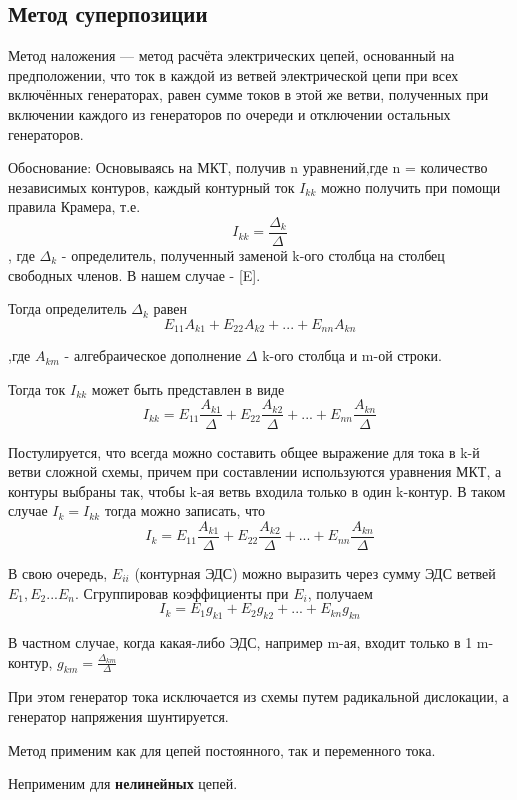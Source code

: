 \subsection{Метод суперпозиции}

Метод наложения — метод расчёта электрических цепей, основанный на предположении, что ток в каждой из ветвей электрической цепи при всех включённых генераторах, равен сумме токов в этой же ветви, полученных при включении каждого из генераторов по очереди и отключении остальных генераторов.

Обоснование:
Основываясь на МКТ, получив n уравнений,где n = количество независимых контуров, каждый контурный ток $I_{kk}$ можно получить при помощи правила Крамера, т.е.
$$ I_{kk} = \frac{\Delta_{k}}{\Delta} $$
, где $\Delta_{k}$ - определитель, полученный заменой k-ого столбца на столбец свободных членов. В нашем случае - [E].

Тогда определитель $\Delta_{k}$ равен 
$$ E_{11}A_{k1} + E_{22}A_{k2} + ... + E_{nn}A_{kn}  $$

,где $A_{km}$ - алгебраическое дополнение $\Delta$ k-ого столбца и m-ой строки.

Тогда ток $I_{kk}$ может быть представлен в виде
$$ I_{kk} =  E_{11}\frac{A_{k1}}{\Delta} + E_{22}\frac{A_{k2}}{\Delta} + ... + E_{nn}\frac{A_{kn}}{\Delta} $$

Постулируется, что всегда можно составить общее выражение для тока в k-й ветви сложной схемы, причем при составлении используются уравнения МКТ, а контуры выбраны так, чтобы k-ая ветвь входила только в один k-контур. В таком случае $I_{k} = I_{kk}$  тогда можно записать, что 
$$ I_{k} =  E_{11}\frac{A_{k1}}{\Delta} + E_{22}\frac{A_{k2}}{\Delta} + ... + E_{nn}\frac{A_{kn}}{\Delta} $$

В свою очередь, $ E_{ii} $ (контурная ЭДС) можно выразить через сумму ЭДС ветвей $ E_1 , E_2 ... E_n $. Сгруппировав коэффициенты при $E_i$, получаем 
$$ I_k = E_{1}g_{k1} + E_{2}g_{k2} + ... + E_{kn}g_{kn} $$

В частном случае, когда какая-либо ЭДС, например m-ая, входит только в 1 m-контур, $ g_{km} = \frac{\Delta_{km}}{\Delta} $   

При этом генератор тока исключается из схемы путем радикальной дислокации, а генератор напряжения шунтируется.

Метод применим как для цепей постоянного, так и переменного тока.

Неприменим для \textbf{нелинейных} цепей.



\pagebreak